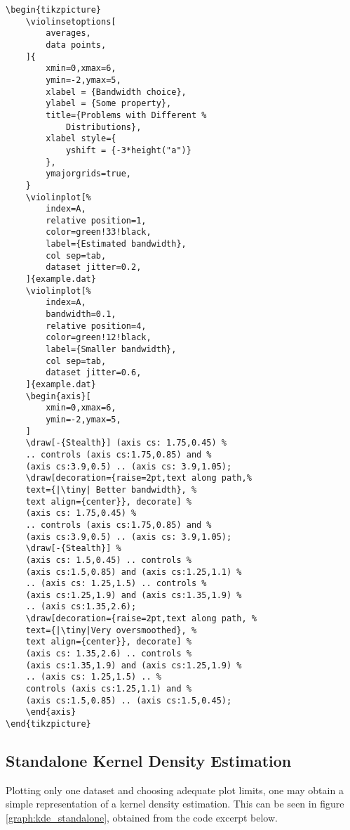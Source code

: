 \documentclass{article}
\begin{document}
\begin{verbatim}
\begin{tikzpicture}
	\violinsetoptions[
		averages,
		data points,
	]{
		xmin=0,xmax=6,
		ymin=-2,ymax=5,
		xlabel = {Bandwidth choice},
		ylabel = {Some property},
		title={Problems with Different %
			Distributions},
		xlabel style={
			yshift = {-3*height("a")}
		},
		ymajorgrids=true,
	}
	\violinplot[%
		index=A,
		relative position=1,
		color=green!33!black,
		label={Estimated bandwidth},
		col sep=tab,
		dataset jitter=0.2,
	]{example.dat}
	\violinplot[%
		index=A,
		bandwidth=0.1,
		relative position=4,
		color=green!12!black,
		label={Smaller bandwidth},
		col sep=tab,
		dataset jitter=0.6,
	]{example.dat}
	\begin{axis}[
		xmin=0,xmax=6,
		ymin=-2,ymax=5,
	]
	\draw[-{Stealth}] (axis cs: 1.75,0.45) %
	.. controls (axis cs:1.75,0.85) and %
	(axis cs:3.9,0.5) .. (axis cs: 3.9,1.05);
	\draw[decoration={raise=2pt,text along path,%
	text={|\tiny| Better bandwidth}, %
	text align={center}}, decorate] %
	(axis cs: 1.75,0.45) %
	.. controls (axis cs:1.75,0.85) and %
	(axis cs:3.9,0.5) .. (axis cs: 3.9,1.05);
	\draw[-{Stealth}] %
	(axis cs: 1.5,0.45) .. controls %
	(axis cs:1.5,0.85) and (axis cs:1.25,1.1) %
	.. (axis cs: 1.25,1.5) .. controls %
	(axis cs:1.25,1.9) and (axis cs:1.35,1.9) %
	.. (axis cs:1.35,2.6);
	\draw[decoration={raise=2pt,text along path, %
	text={|\tiny|Very oversmoothed}, %
	text align={center}}, decorate] %
	(axis cs: 1.35,2.6) .. controls %
	(axis cs:1.35,1.9) and (axis cs:1.25,1.9) %
	.. (axis cs: 1.25,1.5) .. %
	controls (axis cs:1.25,1.1) and %
	(axis cs:1.5,0.85) .. (axis cs:1.5,0.45);
	\end{axis}
\end{tikzpicture}
\end{verbatim}

\subsection{Standalone Kernel Density Estimation}

Plotting only one dataset and choosing adequate plot limits, one
may obtain a simple representation of a kernel density estimation.
This can be seen in figure \ref{graph:kde_standalone}, obtained from the
code excerpt below.
\end{document}
